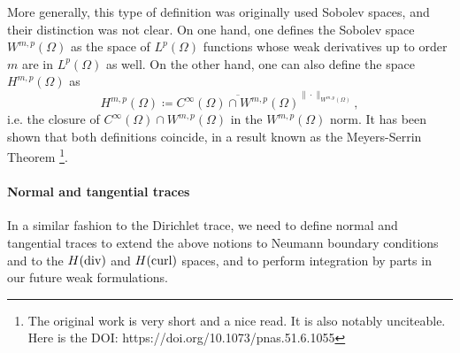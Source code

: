 More generally, this type of definition was originally used Sobolev spaces, and their distinction was not clear. On one hand, one defines the Sobolev space $W^{m,p}(\Omega)$ as the space of $L^p(\Omega)$ functions whose weak derivatives up to order $m$ are in $L^p(\Omega)$ as well. On the other hand, one can also define the space $H^{m,p}(\Omega)$ as
$$ H^{m,p}(\Omega) \coloneqq \overline{C^\infty(\Omega)\cap W^{m,p}(\Omega)}^{\|\cdot \|_{W^{m,p}(\Omega)}}, $$
    i.e. the closure of $C^\infty(\Omega)\cap W^{m,p}(\Omega)$ in the $W^{m,p}(\Omega)$ norm. It has been shown that both definitions coincide, in a result known as the Meyers-Serrin Theorem \cite{adams2003sobolev}\footnote{The original work is very short and a nice read. It is also notably unciteable. Here is the DOI: https://doi.org/10.1073/pnas.51.6.1055}.

\paragraph{Normal and tangential traces}
In a similar fashion to the Dirichlet trace, we need to define normal and tangential traces to extend the above notions to Neumann boundary conditions and to the $H(\operatorname{\text{div}})$ and $H(\operatorname{\text{curl}})$ spaces, and to perform integration by parts in our future weak formulations.

